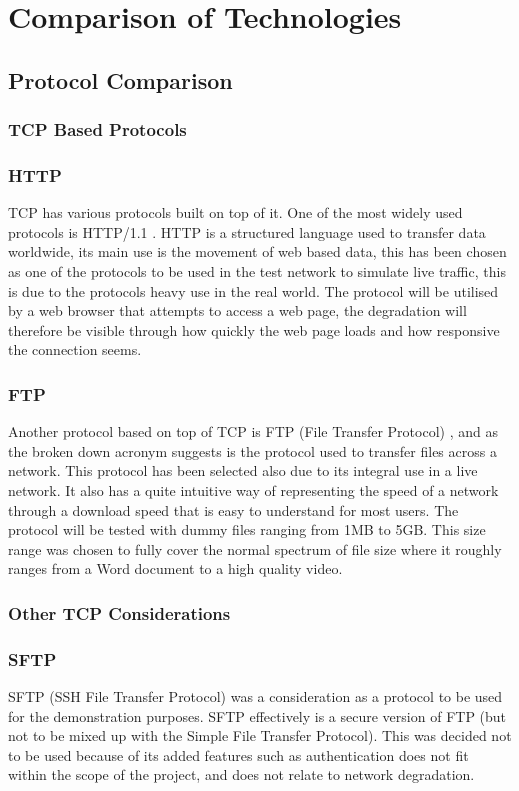 \section{Comparison of Technologies}
\subsection{Protocol Comparison}
\subsubsection{TCP Based Protocols}

\subsubsection*{HTTP}
TCP has various protocols built on top of it. One of the most widely used protocols is HTTP/1.1 \citep{HTTP}. HTTP is a structured language used to transfer data worldwide, its main use is the movement of web based data, this has been chosen as one of the protocols to be used in the test network to simulate live traffic, this is due to the protocols heavy use in the real world. The protocol will be utilised by a web browser that attempts to access a web page, the degradation will therefore be visible through how quickly the web page loads and how responsive the connection seems.

\subsubsection*{FTP}
Another protocol based on top of TCP is FTP (File Transfer Protocol) \citep{FTP}, and as the broken down acronym suggests is the protocol used to transfer files across a network. This protocol has been selected also due to its integral use in a live network. It also has a quite intuitive way of representing the speed of a network through a download speed that is easy to understand for most users. The protocol will be tested with dummy files ranging from 1MB to 5GB. This size range was chosen to fully cover the normal spectrum of file size where it roughly ranges from a Word document to a high quality video.

\subsubsection*{Other TCP Considerations}

\subsubsection*{SFTP}
SFTP (SSH File Transfer Protocol) \citep{SFTP} was a consideration as a protocol to be used for the demonstration purposes. SFTP effectively is a secure version of FTP (but not to be mixed up with the Simple File Transfer Protocol). This was decided not to be used because of its added features such as authentication does not fit within the scope of the project, and does not relate to network degradation. 


